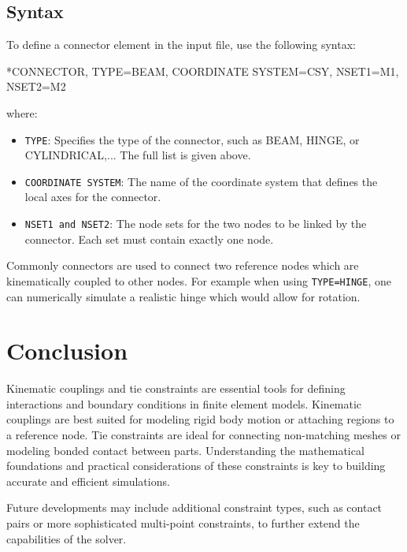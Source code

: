 \subsection{Syntax}

To define a connector element in the input file, use the following syntax:

\begin{codeBlock}
*CONNECTOR, TYPE=BEAM, COORDINATE SYSTEM=CSY, NSET1=M1, NSET2=M2
\end{codeBlock}

where: \begin{itemize}
\item \texttt{TYPE}: Specifies the type of the connector, such as BEAM, HINGE, or CYLINDRICAL,... The full list is given above.
\item \texttt{COORDINATE SYSTEM}: The name of the coordinate system that defines the local axes for the connector.
\item \texttt{NSET1 and NSET2}: The node sets for the two nodes to be linked by the connector. Each set must contain exactly one node.
\end{itemize}

Commonly connectors are used to connect two reference nodes which are kinematically coupled to other nodes.
For example when using \texttt{TYPE=HINGE}, one can numerically simulate a realistic hinge which would allow for rotation.

\section{Conclusion}

Kinematic couplings and tie constraints are essential tools for defining interactions and boundary conditions in finite element models. Kinematic couplings are best suited for modeling rigid body motion or attaching regions to a reference node. Tie constraints are ideal for connecting non-matching meshes or modeling bonded contact between parts. Understanding the mathematical foundations and practical considerations of these constraints is key to building accurate and efficient simulations.

Future developments may include additional constraint types, such as contact pairs or more sophisticated multi-point constraints, to further extend the capabilities of the solver.

